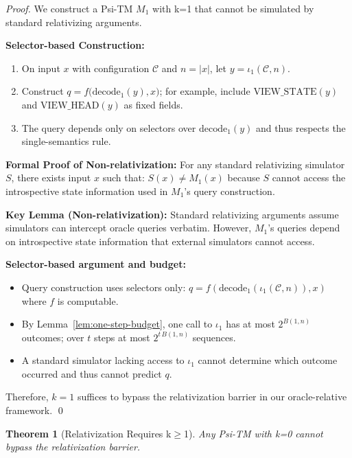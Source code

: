 \documentclass[11pt]{article}
\newtheorem{theorem}{Theorem}[section]
\theoremstyle{definition}
\newcommand{\len}[1]{\left|#1\right|}
\begin{document}
\begin{proof}
We construct a Psi-TM $M_1$ with k=1 that cannot be simulated by standard relativizing arguments.

\textbf{Selector-based Construction:}
\begin{enumerate}
\item On input $x$ with configuration $\mathcal{C}$ and $n=\len{x}$, let $y=\iota_1(\mathcal{C},n)$.
\item Construct $q = f\big(\mathrm{decode}_1(y), x\big)$; for example, include $\mathrm{VIEW\_STATE}(y)$ and $\mathrm{VIEW\_HEAD}(y)$ as fixed fields.
\item The query depends only on selectors over $\mathrm{decode}_1(y)$ and thus respects the single-semantics rule.
\end{enumerate}

\textbf{Formal Proof of Non-relativization:}
For any standard relativizing simulator $S$, there exists input $x$ such that:
$S(x) \neq M_1(x)$ because $S$ cannot access the introspective state information used in $M_1$'s query construction.

\textbf{Key Lemma (Non-relativization):} Standard relativizing arguments assume simulators can intercept oracle queries verbatim. However, $M_1$'s queries depend on introspective state information that external simulators cannot access.

\textbf{Selector-based argument and budget:}
\begin{itemize}
\item Query construction uses selectors only: $q = f(\mathrm{decode}_1(\iota_1(\mathcal{C},n)), x)$ where $f$ is computable.
\item By Lemma~\ref{lem:one-step-budget}, one call to $\iota_1$ has at most $2^{B(1,n)}$ outcomes; over $t$ steps at most $2^{t\,B(1,n)}$ sequences.
\item A standard simulator lacking access to $\iota_1$ cannot determine which outcome occurred and thus cannot predict $q$.
\end{itemize}

Therefore, $k=1$ suffices to bypass the relativization barrier in our oracle-relative framework. \qed
\end{proof}

\begin{theorem}[Relativization Requires k$\geq$1]
\label{thm:relativization-k0}
Any Psi-TM with k=0 cannot bypass the relativization barrier.
\end{theorem}
\end{document}
